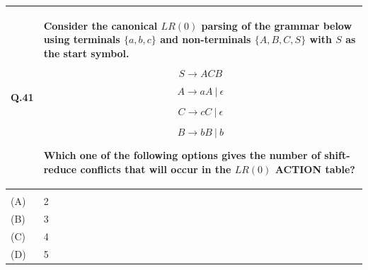 \documentclass[14pt]{article}
\renewcommand{\arraystretch}{1.25}
\begin{document}
\renewcommand{\arraystretch}{1}

\vspace{0.3cm}

\renewcommand{\arraystretch}{1.25}

\begin{tabular}{|p{1.5cm}|p{12cm}|}
\hline

Q.41 &
\parbox[t]{\linewidth}{
\strut
Consider the canonical $LR(0)$ parsing of the grammar below using
terminals $\{a,b,c\}$ and non-terminals $\{A,B,C,S\}$ with $S$ as the
start symbol.

\[
S \rightarrow ACB
\]

\[
A \rightarrow aA\ |\ \epsilon
\]

\[
C \rightarrow cC\ |\ \epsilon
\]

\[
B \rightarrow bB\ |\ b
\]

Which one of the following options gives the number of shift-reduce
conflicts that will occur in the $LR(0)$ ACTION table?

\vspace{0.35cm}
}
\\
\hline

& \\[-0.2cm]
\hline

(A) & 2 \\[0.25cm]
\hline

(B) & 3 \\[0.25cm]
\hline

(C) & 4 \\[0.25cm]
\hline

(D) & 5 \\[0.25cm]
\hline

\end{tabular}

\renewcommand{\arraystretch}{1}

\vspace{0.3cm}

\renewcommand{\arraystretch}{1.25}
\end{document}
